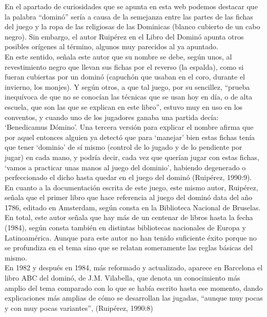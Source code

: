 En el apartado de curiosidades que se apunta en esta web podemos destacar que la palabra “dominó”
sería a causa de la semejanza entre las partes de las fichas del juego y la ropa de las religiosas
de las Dominicas (blanco cubierto de un cabo negro). Sin embargo, el autor Ruipérez en el Libro
del Dominó apunta otros posibles orígenes al término, algunos muy parecidos al ya apuntado. \\

En este sentido, señala este autor que su nombre se debe, según unos, al revestimiento negro que
llevan sus fichas por el reverso (la espalda), como si fueran cubiertas por un dominó (capuchón
que usaban en el coro, durante el invierno, los monjes). Y según otros, a que tal juego, por su
sencillez, “prueba inequívoca de que no se conocían las técnicas que se usan hoy en día, o de alta
escuela, que son las que se explican en este libro”, estuvo muy en uso en los conventos, y cuando
uno de los jugadores ganaba una partida decía: ‘Benedicamus Dómino’. Una tercera versión para
explicar el nombre afirma que por aquel entonces alguien ya detectó que para ‘manejar’ bien estas
fichas tenía que tener ‘dominio’ de sí mismo (control de lo jugado y de lo pendiente por jugar) en
cada mano, y podría decir, cada vez que querían jugar con estas fichas, ‘vamos a practicar unas
manos al juego del dominio’, habiendo degenerado o perfeccionado el dicho hasta quedar en el juego
del dominó (Ruipérez, 1990:9). \\

En cuanto a la documentación escrita de este juego, este mismo autor, Ruipérez, señala que el primer
libro que hace referencia al juego del dominó data del año 1786, editado en Amsterdam, según consta
en la Biblioteca Nacional de Bruselas. En total, este autor señala que hay más de un centenar de
libros hasta la fecha (1984), según consta también en distintas bibliotecas nacionales de Europa y
Latinoamérica. Aunque para este autor no han tenido suficiente éxito porque no se profundiza en
el tema sino que se relatan someramente las reglas básicas del mismo. \\

En 1982 y después en 1984, más reformado y actualizado, aparece en Barcelona el libro ABC del dominó,
de J.M. Vilabella, que denota un conocimiento más amplio del tema comparado con lo que se había
escrito hasta ese momento, dando explicaciones más amplias de cómo se desarrollan las jugadas,
“aunque muy pocas y con muy pocas variantes”, (Ruipérez, 1990:8)

